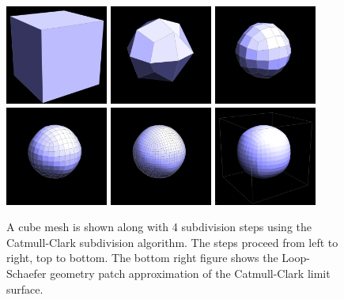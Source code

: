 \documentclass[12pt, letterpaper]{article}
\begin{document}
		\begin{figure}[h]
		\centering
		\includegraphics[width=0.3\textwidth]{cc0}
		\includegraphics[width=0.3\textwidth]{cc1}
		\includegraphics[width=0.3\textwidth]{cc2}
		\includegraphics[width=0.3\textwidth]{cc3}
		\includegraphics[width=0.3\textwidth]{cc4}
		\includegraphics[width=0.3\textwidth]{cc_loop_shaeffer}
		\caption{A cube mesh is shown along with 4 subdivision steps using the Catmull-Clark subdivision algorithm. The steps proceed from left to right, top to bottom.
				The bottom right figure shows the Loop-Schaefer geometry patch approximation of the Catmull-Clark limit surface.}
		\label{fig:Catmull-Clark}
		\end{figure}
\end{document}
